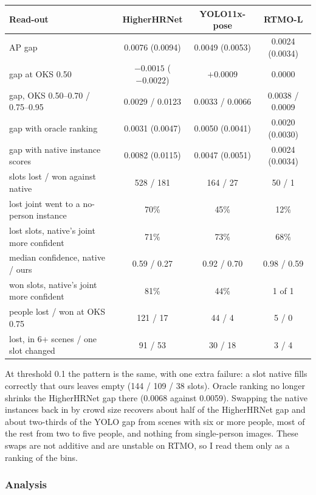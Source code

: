 {\small\setlength{\tabcolsep}{3pt}
\begin{tabular}{lccc}
\hline
\textbf{Read-out} & \textbf{HigherHRNet} & \textbf{YOLO11x-pose} & \textbf{RTMO-L} \\
\hline
AP gap                                   & 0.0076 (0.0094) & 0.0049 (0.0053) & 0.0024 (0.0034) \\
gap at OKS 0.50                          & $-0.0015$ ($-0.0022$) & $+0.0009$ & $0.0000$ \\
gap, OKS 0.50--0.70 / 0.75--0.95         & 0.0029 / 0.0123 & 0.0033 / 0.0066 & 0.0038 / 0.0009 \\
gap with oracle ranking                  & 0.0031 (0.0047) & 0.0050 (0.0041) & 0.0020 (0.0030) \\
gap with native instance scores          & 0.0082 (0.0115) & 0.0047 (0.0051) & 0.0024 (0.0034) \\
slots lost / won against native          & 528 / 181 & 164 / 27 & 50 / 1 \\
lost joint went to a no-person instance  & 70\% & 45\% & 12\% \\
lost slots, native's joint more confident & 71\% & 73\% & 68\% \\
\quad median confidence, native / ours   & 0.59 / 0.27 & 0.92 / 0.70 & 0.98 / 0.59 \\
won slots, native's joint more confident  & 81\% & 44\% & 1 of 1 \\
people lost / won at OKS 0.75            & 121 / 17 & 44 / 4 & 5 / 0 \\
\quad lost, in 6+ scenes / one slot changed & 91 / 53 & 30 / 18 & 3 / 4 \\
\hline
\end{tabular}
}

\vspace{0.5em}

At threshold 0.1 the pattern is the same, with one extra failure: a slot native fills correctly that ours leaves empty (144 / 109 / 38 slots).
Oracle ranking no longer shrinks the HigherHRNet gap there (0.0068 against 0.0059).
Swapping the native instances back in by crowd size recovers about half of the HigherHRNet gap and about two-thirds of the YOLO gap from scenes with six or more people, most of the rest from two to five people, and nothing from single-person images.
These swaps are not additive and are unstable on RTMO, so I read them only as a ranking of the bins.

\subsubsection{Analysis}

